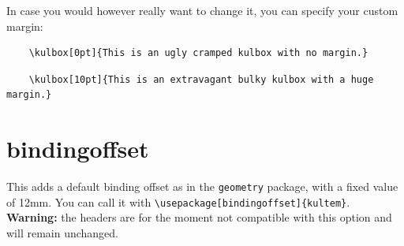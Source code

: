 \documentclass[oneside,a4paper,11pt,explicit]{book}
\begin{document}
In case you would however really want to change it, you can specify your custom margin:
\begin{lstlisting}
    \kulbox[0pt]{This is an ugly cramped kulbox with no margin.}
\end{lstlisting}
\begin{lstlisting}
    \kulbox[10pt]{This is an extravagant bulky kulbox with a huge margin.}
\end{lstlisting}

\section{bindingoffset}
This adds a default binding offset as in the \verb|geometry| package, with a fixed value of 12mm. You can call it with \verb|\usepackage[bindingoffset]{kultem}|. \textbf{Warning:} the headers are for the moment not compatible with this option and will remain unchanged.
\end{document}

